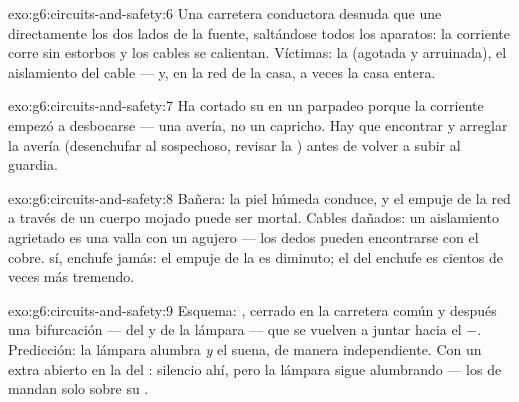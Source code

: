\begin{solution}{exo:g6:circuits-and-safety:6}
Una carretera conductora desnuda que une directamente los dos lados de
la fuente, saltándose todos los aparatos: la corriente corre sin
estorbos y los cables se calientan. Víctimas: la 
(agotada y arruinada), el aislamiento del cable --- y, en la red de la
casa, a veces la casa entera.
\end{solution}

\begin{solution}{exo:g6:circuits-and-safety:7}
Ha cortado su  en un parpadeo porque la corriente empezó a
desbocarse --- una avería, no un capricho. Hay que encontrar y arreglar
la avería (desenchufar al sospechoso, revisar la ) antes de
volver a subir al guardia.
\end{solution}

\begin{solution}{exo:g6:circuits-and-safety:8}
Bañera: la piel húmeda conduce, y el empuje de la red a través de un
cuerpo mojado puede ser mortal. Cables dañados: un aislamiento
agrietado es una valla con un agujero --- los dedos pueden encontrarse
con el cobre.  sí, enchufe jamás: el empuje de la  es
diminuto; el del enchufe es cientos de veces más tremendo.
\end{solution}

\begin{solution}{exo:g6:circuits-and-safety:9}
Esquema: ,  cerrado en la carretera común y después
una bifurcación ---  del  y  de la
lámpara --- que se vuelven a juntar hacia el $-$. Predicción: la
lámpara alumbra \emph{y} el  suena, de manera independiente.
Con un  extra abierto en la  del :
silencio ahí, pero la lámpara sigue alumbrando --- los
 de  mandan solo sobre su .
\end{solution}

